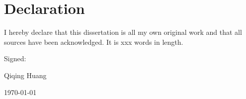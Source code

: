 \chapter*{Declaration}
I hereby declare that this dissertation is all my own
original work and that all sources have
been acknowledged. It is xxx words in
length.

\vspace{1cm}
Signed: \\
\hspace*{1cm}\phantom{Signed: }\hrulefill

\hspace*{0.5cm}\phantom{Signed: }Qiqing Huang

\hspace*{0.5cm}\phantom{Signed: }\today
